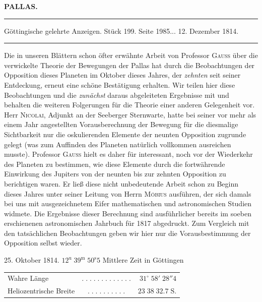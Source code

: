 \clearpage{}\hypertarget{native-384-lower}{}\label{native-384-lower}
\begin{center}\textbf{PALLAS.}\par\vspace{4pt}\hrule\vspace{4pt}\fontsize{10}{12}\selectfont Göttingische gelehrte Anzeigen. Stück 199. Seite 1985\;... 12. Dezember 1814.\par\vspace{4pt}\hrule\vspace{4pt}\end{center}

\par\indent Die in unseren Blättern schon öfter erwähnte Arbeit von Professor \textsc{Gauss} über die verwickelte Theorie der Bewegungen der Pallas hat durch die Beobachtungen der Opposition dieses Planeten im Oktober dieses Jahres, der \emph{zehnten} seit seiner Entdeckung, erneut eine schöne Bestätigung erhalten. Wir teilen hier diese Beobachtungen und die \emph{zunächst} daraus abgeleiteten Ergebnisse mit und behalten die weiteren Folgerungen für die Theorie einer anderen Gelegenheit vor. Herr \textsc{Nicolai}, Adjunkt an der Seeberger Sternwarte, hatte bei seiner vor mehr als einem Jahr angestellten Vorausberechnung der Bewegung für die diesmalige Sichtbarkeit nur die oskulierenden Elemente der neunten Opposition zugrunde gelegt (was zum Auffinden des Planeten natürlich vollkommen ausreichen musste). Professor \textsc{Gauss} hielt es daher für interessant, noch vor der Wiederkehr des Planeten zu bestimmen, wie diese Elemente durch die fortwährende Einwirkung des Jupiters von der neunten bis zur zehnten Opposition zu berichtigen waren. Er ließ diese nicht unbedeutende Arbeit schon zu Beginn dieses Jahres unter seiner Leitung von Herrn \textsc{Möbius} ausführen, der sich damals bei uns mit ausgezeichnetem Eifer mathematischen und astronomischen Studien widmete. Die Ergebnisse dieser Berechnung sind ausführlicher bereits im soeben erschienenen astronomischen Jahrbuch für 1817 abgedruckt. Zum Vergleich mit den tatsächlichen Beobachtungen geben wir hier nur die Vorausbestimmung der Opposition selbst wieder.

\begin{center}25. Oktober 1814. $12^{\mathrm u}\;39^{\mathrm m}\;50^{\mathrm s}5$ Mittlere Zeit in Göttingen\end{center}
\begin{center}\fontsize{10}{12}\selectfont\setlength{\tabcolsep}{3pt}\renewcommand{\arraystretch}{1.15}\begin{tabular}{lcr}
Wahre Länge & $.\;.\;.\;.\;.\;.\;.\;.\;.\;.\;.\;.\;.$ & $31^\circ\;58'\;28''4$\\
Heliozentrische Breite & $.\;.\;.\;.\;.\;.\;.\;.\;.\;.$ & $23\;38\;32.7\;\mathrm{S.}$\\
\end{tabular}\end{center}

